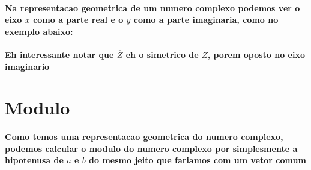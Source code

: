 \documentclass[12pt,twoside, a4paper, twocolumn]{article}
\newcommand{\drawvector} [9] [blue] {
    \draw[line width=1.5pt,#1,-stealth](axis cs: #2, #3)--(axis cs: #4, #5) node[anchor=south west]{$#6$};

    

\ifthenelse{\equal{#7}{true}}{
    \draw[line width=1pt,#1, dashed](axis cs: #4, #5)--(axis cs: #4, 0) node[anchor= north west]{$#8$};
    \draw[line width=1pt,#1, dashed](axis cs: #4, #5)--(axis cs: 0, #5) node[anchor=south east]{$#9$};
    }
    {}

}
\begin{document}
\paragraph{Na representacao geometrica de um numero complexo podemos ver o eixo $x$ como a parte real e o $y$ como a parte imaginaria, como no exemplo abaixo:}
\paragraph*{}


\begin{adjustbox}{scale=0.9}
\end{adjustbox}

\paragraph*{Eh interessante notar que $\overline{Z}$ eh o simetrico de $Z$, porem oposto no eixo imaginario}

\section{Modulo}

\paragraph*{Como temos uma representacao geometrica do numero complexo, podemos calcular o modulo do numero complexo por simplesmente a hipotenusa de $a$ e $b$ do mesmo jeito que fariamos com um vetor comum}
\end{document}
